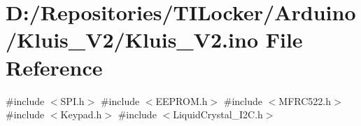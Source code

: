 \hypertarget{_kluis___v2_8ino}{}\section{D\+:/\+Repositories/\+T\+I\+Locker/\+Arduino/\+Kluis\+\_\+\+V2/\+Kluis\+\_\+\+V2.ino File Reference}
\label{_kluis___v2_8ino}
{\ttfamily \#include $<$S\+P\+I.\+h$>$}\newline
{\ttfamily \#include $<$E\+E\+P\+R\+O\+M.\+h$>$}\newline
{\ttfamily \#include $<$M\+F\+R\+C522.\+h$>$}\newline
{\ttfamily \#include $<$Keypad.\+h$>$}\newline
{\ttfamily \#include $<$Liquid\+Crystal\+\_\+\+I2\+C.\+h$>$}\newline
